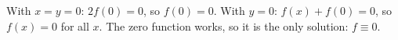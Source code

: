 With $x=y=0$: $2f(0)=0$, so $f(0)=0$. With $y=0$: $f(x)+f(0)=0$, so $f(x)=0$ for all $x$. The zero function works, so it is the only solution: $\boxed{f\equiv0}$.

